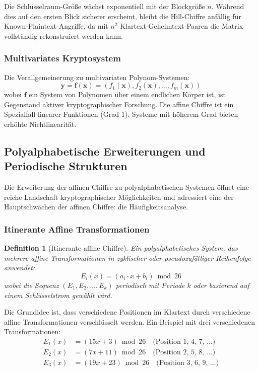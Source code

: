 ﻿\documentclass[12pt,a4paper]{article}
\newtheorem{definition}{Definition}
\begin{document}
	Die Schlüsselraum-Größe wächst exponentiell mit der Blockgröße $n$. Während dies auf den ersten Blick sicherer erscheint, bleibt die Hill-Chiffre anfällig für Known-Plaintext-Angriffe, da mit $n^2$ Klartext-Geheimtext-Paaren die Matrix vollständig rekonstruiert werden kann.
	
	\subsubsection{Multivariates Kryptosystem}
	
	Die Verallgemeinerung zu multivariaten Polynom-Systemen:
	\begin{equation}
		\mathbf{y} = \mathbf{f}(\mathbf{x}) = (f_1(\mathbf{x}), f_2(\mathbf{x}), \ldots, f_m(\mathbf{x}))
	\end{equation}
	wobei $\mathbf{f}$ ein System von Polynomen über einem endlichen Körper ist, ist Gegenstand aktiver kryptographischer Forschung. Die affine Chiffre ist ein Spezialfall linearer Funktionen (Grad 1). Systeme mit höherem Grad bieten erhöhte Nichtlinearität.
	
	
	\subsection{Polyalphabetische Erweiterungen und Periodische Strukturen}
	
	Die Erweiterung der affinen Chiffre zu polyalphabetischen Systemen öffnet eine reiche Landschaft kryptographischer Möglichkeiten und adressiert eine der Hauptschwächen der affinen Chiffre: die Häufigkeitsanalyse.
	
	\subsubsection{Itinerante Affine Transformationen}
	
	\begin{definition}[Itinerante affine Chiffre]
		Ein polyalphabetisches System, das mehrere affine Transformationen in zyklischer oder pseudozufälliger Reihenfolge anwendet:
		\begin{equation}
			E_i(x) = (a_i \cdot x + b_i) \bmod 26
		\end{equation}
		wobei die Sequenz $(E_1, E_2, \ldots, E_k)$ periodisch mit Periode $k$ oder basierend auf einem Schlüsselstrom gewählt wird.
	\end{definition}
	
	Die Grundidee ist, dass verschiedene Positionen im Klartext durch verschiedene affine Transformationen verschlüsselt werden. Ein Beispiel mit drei verschiedenen Transformationen:
	\begin{align}
		E_1(x) &= (15x + 3) \bmod 26 \quad \text{(Position 1, 4, 7, ...)} \\
		E_2(x) &= (7x + 11) \bmod 26 \quad \text{(Position 2, 5, 8, ...)} \\
		E_3(x) &= (19x + 23) \bmod 26 \quad \text{(Position 3, 6, 9, ...)}
	\end{align}
	
\end{document}
